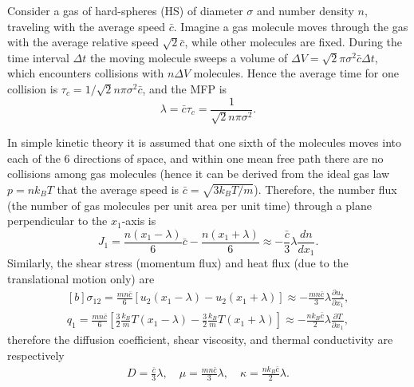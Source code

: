 Consider a gas of hard-spheres (HS)  of diameter $\sigma$ and number density $n$, traveling with the average speed $\bar{c}$. Imagine a gas molecule moves through the gas with the average relative speed $\sqrt{2}\bar{c}$, while other molecules are fixed. During the time interval $\Delta{t}$ the moving molecule sweeps a volume of $\Delta{V}=\sqrt{2}\pi\sigma^2\bar{c}\Delta{t}$, which encounters collisions with $n\Delta{V}$ molecules. Hence the average time for one collision is $\tau_c={1}/{\sqrt{2}n\pi\sigma^2\bar{c}}$,
and the MFP is 
\begin{equation}\label{mfp_hs}
\lambda=\bar{c}\tau_c=\frac{1}{\sqrt{2}n\pi\sigma^2}.
\end{equation}

In simple kinetic theory it is assumed that one sixth of the molecules moves into each of the 6 directions of space, and within one mean free path there are no collisions among gas molecules (hence it can be derived from the ideal gas law $p=nk_BT$ that the average speed is $\bar{c}=\sqrt{{3k_BT}/{m}}$). 
Therefore, the number flux (the number of gas molecules per unit area per unit time) through a plane perpendicular to the $x_1$-axis is 
\begin{equation}\label{simple_kinetic1}
J_1=\frac{n(x_1-\lambda)}{6}\bar{c}-\frac{n(x_1+\lambda)}{6}
\approx -\frac{\bar{c}}{3}\lambda\frac{dn}{dx_1}.
\end{equation}
Similarly, the shear stress (momentum flux) and heat flux (due to the translational motion only) are
\begin{equation}\label{simple_kinetic2}
\begin{aligned}[b]
\sigma_{12}=\frac{mn\bar{c}}{6}
\left[
u_2(x_1-\lambda)-u_2(x_1+\lambda)
\right]
\approx-\frac{mn\bar{c}}{3}\lambda\frac{\partial u_2}{\partial x_1},\\
q_{1}=\frac{mn\bar{c}}{6}
\left[\frac{3}{2}\frac{k_B}{m}T(x_1-\lambda)
-\frac{3}{2}\frac{k_B}{m}T(x_1+\lambda)\right]
\approx-\frac{nk_B\bar{c}}{2}\lambda\frac{\partial T}{\partial x_1},
\end{aligned}
\end{equation}
therefore the diffusion coefficient, shear viscosity, and thermal conductivity are respectively
\begin{equation}
\begin{aligned}
D=\frac{\bar{c}}{3}\lambda,\quad
\mu=\frac{mn\bar{c}}{3}\lambda, \quad
\kappa=\frac{nk_B\bar{c}}{2}\lambda.
\end{aligned}
\end{equation}

